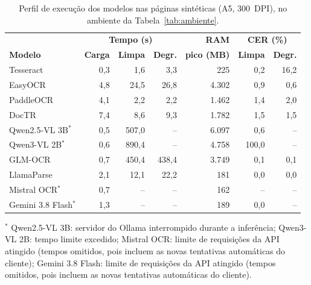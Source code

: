 \begin{table}[H]
\centering
\caption{Perfil de execução dos modelos nas páginas sintéticas (A5, 300~DPI), no
ambiente da Tabela~\ref{tab:ambiente}.}
\label{tab:eda_resumo}
\renewcommand{\arraystretch}{1.25}
{\small
\begin{tabular}{l r r r r r r}
\hline
& \multicolumn{3}{c}{\textbf{Tempo (s)}} & \textbf{RAM} & \multicolumn{2}{c}{\textbf{CER (\%)}} \\
\textbf{Modelo} & \textbf{Carga} & \textbf{Limpa} & \textbf{Degr.} & \textbf{pico (MB)} & \textbf{Limpa} & \textbf{Degr.} \\
\hline
Tesseract & 0,3 & 1,6 & 3,3 & 225 & 0,2 & 16,2 \\
EasyOCR & 4,8 & 24,5 & 26,8 & 4.302 & 0,9 & 0,6 \\
PaddleOCR & 4,1 & 2,2 & 2,2 & 1.462 & 1,4 & 2,0 \\
DocTR & 7,4 & 8,6 & 9,3 & 1.782 & 1,5 & 1,5 \\
\hline
Qwen2.5-VL 3B$^{*}$ & 0,5 & 507,0 & -- & 6.097 & 0,6 & -- \\
Qwen3-VL 2B$^{*}$ & 0,6 & 890,4 & -- & 4.758 & 100,0 & -- \\
GLM-OCR & 0,7 & 450,4 & 438,4 & 3.749 & 0,1 & 0,1 \\
\hline
LlamaParse & 2,1 & 12,1 & 22,2 & 181 & 0,0 & 0,0 \\
Mistral OCR$^{*}$ & 0,7 & -- & -- & 162 & -- & -- \\
Gemini 3.8 Flash$^{*}$ & 1,3 & -- & -- & 189 & 0,0 & -- \\
\hline
\end{tabular}
}
\par\footnotesize{$^{*}$ Qwen2.5-VL 3B: servidor do Ollama interrompido durante a inferência; Qwen3-VL 2B: tempo limite excedido; Mistral OCR: limite de requisições da API atingido (tempos omitidos, pois incluem as novas tentativas automáticas do cliente); Gemini 3.8 Flash: limite de requisições da API atingido (tempos omitidos, pois incluem as novas tentativas automáticas do cliente).}
\end{table}
